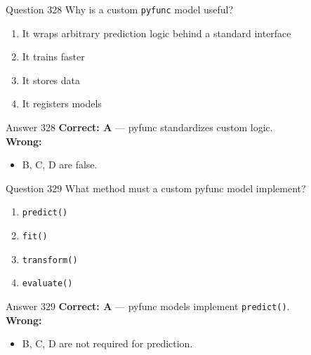 \documentclass[aspectratio=169,11pt]{beamer}
\begin{document}
	\begin{frame}{Question 328}
		Why is a custom \texttt{pyfunc} model useful?
		\begin{enumerate}[label=\Alph*.]
			\item It wraps arbitrary prediction logic behind a standard interface
			\item It trains faster
			\item It stores data
			\item It registers models
		\end{enumerate}
	\end{frame}
	\begin{frame}{Answer 328}
		\textbf{Correct: A} --- pyfunc standardizes custom logic.\\
		\vspace{0.5em}
		\textbf{Wrong:}
		\begin{itemize}
			\item B, C, D are false.
		\end{itemize}
	\end{frame}
	
	\begin{frame}{Question 329}
		What method must a custom pyfunc model implement?
		\begin{enumerate}[label=\Alph*.]
			\item \texttt{predict()}
			\item \texttt{fit()}
			\item \texttt{transform()}
			\item \texttt{evaluate()}
		\end{enumerate}
	\end{frame}
	\begin{frame}{Answer 329}
		\textbf{Correct: A} --- pyfunc models implement \texttt{predict()}.\\
		\vspace{0.5em}
		\textbf{Wrong:}
		\begin{itemize}
			\item B, C, D are not required for prediction.
		\end{itemize}
	\end{frame}
	
\end{document}

